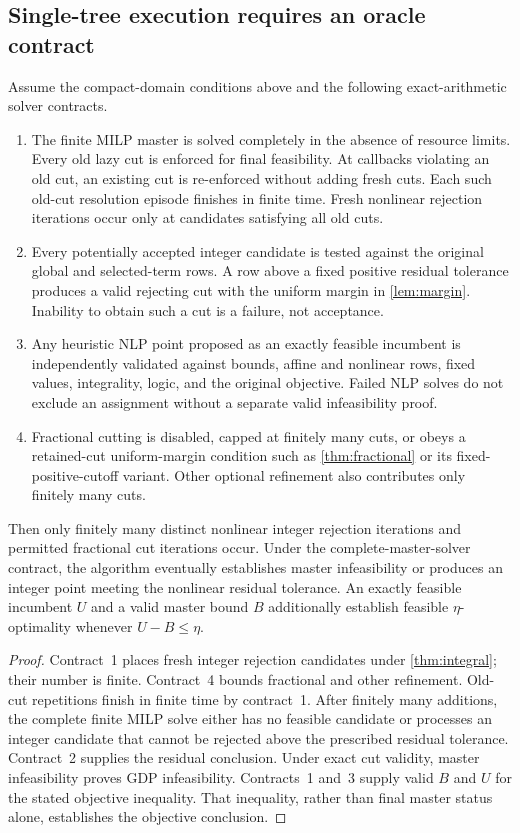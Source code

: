 \subsection{Single-tree execution requires an oracle contract}\label{sec:tree-contract}
\begin{theorem}\label{thm:single-tree}
Assume the compact-domain conditions above and the following exact-arithmetic solver contracts.
\begin{enumerate}
 \item The finite MILP master is solved completely in the absence of resource limits. Every old lazy cut is enforced for final feasibility. At callbacks violating an old cut, an existing cut is re-enforced without adding fresh cuts. Each such old-cut resolution episode finishes in finite time. Fresh nonlinear rejection iterations occur only at candidates satisfying all old cuts.
 \item Every potentially accepted integer candidate is tested against the original global and selected-term rows. A row above a fixed positive residual tolerance produces a valid rejecting cut with the uniform margin in \cref{lem:margin}. Inability to obtain such a cut is a failure, not acceptance.
 \item Any heuristic NLP point proposed as an exactly feasible incumbent is independently validated against bounds, affine and nonlinear rows, fixed values, integrality, logic, and the original objective. Failed NLP solves do not exclude an assignment without a separate valid infeasibility proof.
 \item Fractional cutting is disabled, capped at finitely many cuts, or obeys a retained-cut uniform-margin condition such as \cref{thm:fractional} or its fixed-positive-cutoff variant. Other optional refinement also contributes only finitely many cuts.
\end{enumerate}
Then only finitely many distinct nonlinear integer rejection iterations and permitted fractional cut iterations occur. Under the complete-master-solver contract, the algorithm eventually establishes master infeasibility or produces an integer point meeting the nonlinear residual tolerance. An exactly feasible incumbent $U$ and a valid master bound $B$ additionally establish feasible $\eta$-optimality whenever $U-B\le\eta$.
\end{theorem}
\begin{proof}
Contract~1 places fresh integer rejection candidates under \cref{thm:integral}; their number is finite. Contract~4 bounds fractional and other refinement. Old-cut repetitions finish in finite time by contract~1. After finitely many additions, the complete finite MILP solve either has no feasible candidate or processes an integer candidate that cannot be rejected above the prescribed residual tolerance. Contract~2 supplies the residual conclusion. Under exact cut validity, master infeasibility proves GDP infeasibility. Contracts~1 and~3 supply valid $B$ and $U$ for the stated objective inequality. That inequality, rather than final master status alone, establishes the objective conclusion.
\end{proof}
